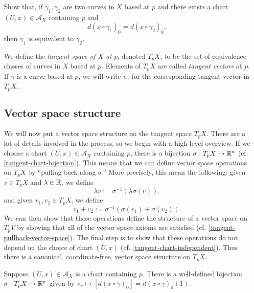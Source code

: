\begin{exercise}
	Show that, if $\gamma_1, \gamma_2$ are two curves in $X$ based at $p$ and there exists a chart $(U, x) \in \mathscr{A}_X$ containing $p$ and \[ d(x \circ \gamma_1)_0 = d(x \circ \gamma_2)_0, \]
	then $\gamma_1$ is equivalent to $\gamma_2$.  
\end{exercise}

\begin{definition} 
	We define the \emph{tangent space of $X$ at $p$}, denoted $T_p X$, to be the set of equivalence classes of curves in $X$ based at $p$. Elements of $T_p X$ are called \emph{tangent vectors} at $p$. If $\gamma$ is a curve based at $p$, we will write $v_\gamma$ for the corresponding tangent vector in $T_p X$. 
\end{definition}

\subsection{Vector space structure} \label{tangent-vector-space}

We will now put a vector space structure on the tangent space $T_p X$. There are a lot of details involved in the process, so we begin with a high-level overview. If we choose a chart $(U, x) \in \mathscr{A}_X$ containing $p$, there is a bijection $\sigma : T_p X \to \mathbb{R}^n$ (cf. \cref{tangent-chart-bijection}). This means that we can define vector space operations on $T_p X$ by ``pulling back along $\sigma$.'' More precisely, this mean the following: given $v \in T_p X$ and $\lambda \in \mathbb{R}$, we define
\[ \lambda v := \sigma^{-1}(\lambda \sigma(v)), \]
and given $v_1, v_2 \in T_p X$, we define
\[ v_1 + v_2 := \sigma^{-1}(\sigma(v_1) + \sigma(v_2)). \]
We can then show that these operations define the structure of a vector space on $T_p V$ by showing that all of the vector space axioms are satisfied (cf. \cref{tangent-pullback-vector-space}). 
The final step is to show that these operations do not depend on the choice of chart $(U, x)$ (cf. \cref{tangent-chart-independent}). Thus there is a canonical, coordinate-free, vector space structure on $T_p X$. 

\begin{lemma} \label{tangent-chart-bijection}
	Suppose $(U, x) \in \mathscr{A}_X$ is a chart containing $p$. There is a well-defined bijection $\sigma : T_p X \to \mathbb{R}^n$ given by $v_\gamma \mapsto [d(x \circ \gamma)_0] = d(x \circ  \gamma)_0(1)$. 
\end{lemma}

